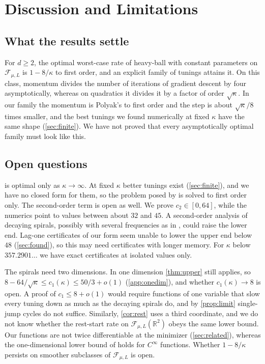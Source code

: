 \documentclass[11pt, a4paper]{article}
\theoremstyle{definition}
\newcommand{\R}{\mathbb{R}}
\newcommand{\F}{\mathcal{F}_{\mu,L}}
\begin{document}
\section{Discussion and Limitations}
\label{sec:discussion}

\subsection{What the results settle}

For $d\ge2$, the optimal worst-case rate of heavy-ball with constant parameters on $\F$ is $1-8/\kappa$ to first order,
and an explicit family of tunings attains it. On this class, momentum divides the number of iterations of gradient
descent by four asymptotically, whereas on quadratics it divides it by a factor of order $\sqrt\kappa$. In our family
the momentum is Polyak's to first order and the step is about $\sqrt\kappa/8$ times smaller, and the best tunings we found
numerically at fixed $\kappa$ have the same shape (\cref{sec:finite}). We have not proved that every asymptotically
optimal family must look like this.

\subsection{Open questions}

 is optimal only as $\kappa\to\infty$. At fixed $\kappa$ better tunings exist (\cref{sec:finite}), and
we have no closed form for them, so the problem posed by \citet[§10.3.3]{goujaud2024thesis} is solved to first order
only. The second-order term is open as well. We prove $c_2\in[0,64]$, while the numerics point to values between about $32$
and $45$. A second-order analysis of decaying spirals, possibly with several frequencies as in
\citet{pasechniuk2026two}, could raise the lower end. Lag-one certificates of our form seem unable to lower the upper
end below $48$ (\cref{sec:found}), so this may need certificates with longer memory. For $\kappa$ below $357.2901\ldots$
we have exact certificates at isolated values only.

The spirals need two dimensions. In one dimension \cref{thm:upper} still applies, so
$8-64/\sqrt\kappa\le c_1(\kappa)\le50/3+o(1)$ (\cref{app:onedim}), and whether $c_1(\kappa)\to8$ is open. A proof of
$c_1\le8+o(1)$ would require functions of one variable that slow every tuning down as much as the decaying spirals do,
and by \cref{prop:limit} single-jump cycles do not suffice. Similarly,
\cref{cor:rest} uses a third coordinate, and we do not know whether the rest-start rate on $\F(\R^2)$ obeys the same
lower bound. Our functions are not twice differentiable at the minimizer (\cref{sec:related}), whereas the
one-dimensional lower bound of \citet{liu2026sharp} holds for $C^\infty$ functions. Whether $1-8/\kappa$ persists on
smoother subclasses of $\F$ is open.
\end{document}
